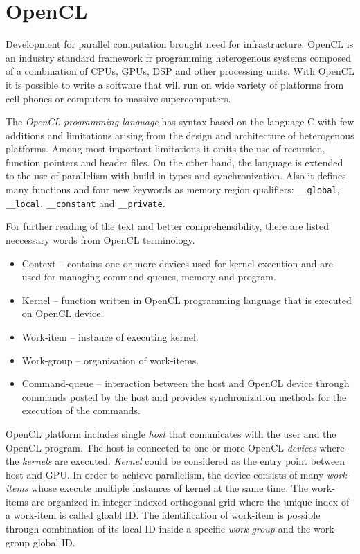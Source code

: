 \section{OpenCL}
Development for parallel computation brought need for infrastructure. OpenCL
is an industry standard framework fr programming heterogenous systems 
composed of a combination of CPUs, GPUs, DSP and other processing 
units\cite{opencl}. With OpenCL it is possible to write a software that will
run on wide variety of platforms from cell phones or computers to massive
supercomputers. 

The \textit{OpenCL programming language} has syntax based
on the language C with few additions and limitations arising from the design
and architecture of heterogenous platforms. Among most important limitations
it omits the use of recursion, function pointers and header files. On the 
other hand, the language is extended to the use of parallelism with build 
in types and synchronization. Also it defines many functions and four new
keywords as memory region qualifiers: \texttt{\_\_global}, 
\texttt{\_\_local}, \texttt{\_\_constant} and \texttt{\_\_private}.

For further reading of the text and better comprehensibility, there are
listed neccessary words from OpenCL terminology\cite{opencl}.
\begin{itemize}
\item Context -- contains one or more devices used for kernel execution
and are used for managing command queues, memory and program.
\item Kernel -- function written in OpenCL programming language that 
is executed on OpenCL device. 
\item Work-item -- instance of executing kernel. 
\item Work-group -- organisation of work-items. 
\item Command-queue -- interaction between the host and OpenCL
device through commands posted by the host and provides synchronization
methods for the execution of the commands.
\end{itemize}

OpenCL platform includes single \textit{host} that comunicates with the user
and the OpenCL program. The host is connected to one or more
OpenCL \textit{devices} where the \textit{kernels} are executed. 
\textit{Kernel} could be considered as the entry point between host and
GPU. In order to achieve parallelism, the device consists of many 
\textit{work-items} whose execute multiple instances of kernel at the same 
time. The work-items are organized in integer indexed orthogonal grid where 
the unique index of a work-item is called gloabl ID. The identification
of work-item is possible through combination of its local ID inside a specific
\textit{work-group} and the work-group global ID.

